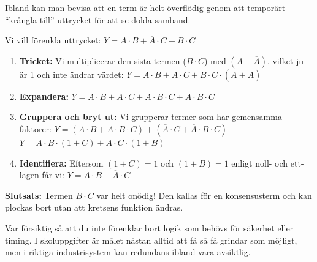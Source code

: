 \documentclass[
  swedish,
  letterpaper,
  oneside,
  openany]{book}
\begin{document}
\begin{tcolorbox}[enhanced jigsaw, arc=.35mm, bottomrule=.15mm, bottomtitle=1mm, breakable, colback=white, colbacktitle=quarto-callout-note-color!10!white, colframe=quarto-callout-note-color-frame, coltitle=black, left=2mm, leftrule=.75mm, opacityback=0, opacitybacktitle=0.6, rightrule=.15mm, title=\textcolor{quarto-callout-note-color}{\faInfo}\hspace{0.5em}{Exempel: Identifiering av redundans (Konsensuslagen)}, titlerule=0mm, toprule=.15mm, toptitle=1mm]

Ibland kan man bevisa att en term är helt överflödig genom att temporärt
``krångla till'' uttrycket för att se dolda samband.

Vi vill förenkla uttrycket:
\(Y = A \cdot B + \overline{A} \cdot C + B \cdot C\)

\begin{enumerate}
\def\labelenumi{\arabic{enumi}.}
\item
  \textbf{Tricket:} Vi multiplicerar den sista termen (\(B \cdot C\))
  med \((A + \overline{A})\), vilket ju är 1 och inte ändrar värdet:
  \(Y = A \cdot B + \overline{A} \cdot C + B \cdot C \cdot (A + \overline{A})\)
\item
  \textbf{Expandera:}
  \(Y = A \cdot B + \overline{A} \cdot C + A \cdot B \cdot C + \overline{A} \cdot B \cdot C\)
\item
  \textbf{Gruppera och bryt ut:} Vi grupperar termer som har gemensamma
  faktorer:
  \(Y = (A \cdot B + A \cdot B \cdot C) + (\overline{A} \cdot C + \overline{A} \cdot B \cdot C)\)
  \(Y = A \cdot B \cdot (1 + C) + \overline{A} \cdot C \cdot (1 + B)\)
\item
  \textbf{Identifiera:} Eftersom \((1+C)=1\) och \((1+B)=1\) enligt
  noll- och ett-lagen får vi: \(Y = A \cdot B + \overline{A} \cdot C\)
\end{enumerate}

\textbf{Slutsats:} Termen \(B \cdot C\) var helt onödig! Den kallas för
en konsensusterm och kan plockas bort utan att kretsens funktion ändras.

\end{tcolorbox}

\begin{tcolorbox}[enhanced jigsaw, arc=.35mm, bottomrule=.15mm, bottomtitle=1mm, breakable, colback=white, colbacktitle=quarto-callout-warning-color!10!white, colframe=quarto-callout-warning-color-frame, coltitle=black, left=2mm, leftrule=.75mm, opacityback=0, opacitybacktitle=0.6, rightrule=.15mm, title=\textcolor{quarto-callout-warning-color}{\faExclamationTriangle}\hspace{0.5em}{Fallgrop: ``Överoptimering''}, titlerule=0mm, toprule=.15mm, toptitle=1mm]

Var försiktig så att du inte förenklar bort logik som behövs för
säkerhet eller timing. I skoluppgifter är målet nästan alltid att få så
få grindar som möjligt, men i riktiga industrisystem kan redundans
ibland vara avsiktlig.

\end{tcolorbox}
\end{document}
